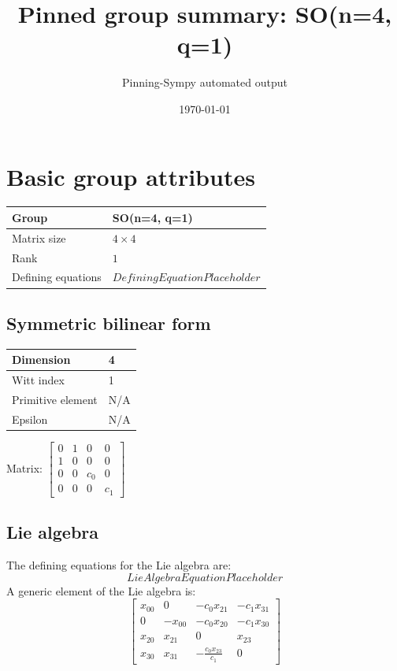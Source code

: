 \documentclass[11pt]{article}
\title{Pinned group summary: SO(n=4, q=1)}
\author{Pinning-Sympy automated output}
\date{\today}
\theoremstyle{definition}
\begin{document}
\maketitle
\tableofcontents

\newpage

\section{Basic group attributes}

\begin{tabular}{|l|l|}
	\hline
    Group & SO(n=4, q=1) \\
	\hline
    Matrix size & $4 \times 4$ \\
	\hline
    Rank & $1$ \\
	\hline
	Defining equations & $DefiningEquationPlaceholder$ \\
	\hline
\end{tabular}

\subsection{Symmetric bilinear form}
\begin{tabular}{|l|l|}
    \hline
    Dimension & 4 \\
    \hline
    Witt index & 1 \\
    \hline
    Primitive element & N/A \\
    \hline
    Epsilon & N/A \\
    \hline
\end{tabular}

\bigskip
\noindent Matrix: \(
\left[\begin{matrix}0 & 1 & 0 & 0\\1 & 0 & 0 & 0\\0 & 0 & c_{0} & 0\\0 & 0 & 0 & c_{1}\end{matrix}\right]
\)



\subsection{Lie algebra}

The defining equations for the Lie algebra are:
\[
LieAlgebraEquationPlaceholder
\]
A generic element of the Lie algebra is:
\[
\left[\begin{matrix}x_{0 0} & 0 & - c_{0} x_{2 1} & - c_{1} x_{3 1}\\0 & - x_{0 0} & - c_{0} x_{2 0} & - c_{1} x_{3 0}\\x_{2 0} & x_{2 1} & 0 & x_{2 3}\\x_{3 0} & x_{3 1} & - \frac{c_{0} x_{2 3}}{c_{1}} & 0\end{matrix}\right]
\]
\end{document}
